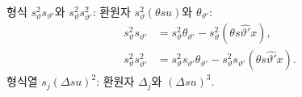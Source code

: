
형식 $s_\vartheta^2s_{\vartheta'}$와 $s_\vartheta^2s_{\vartheta'}^2$: 환원자 $s_\vartheta^2(\theta su)$와 $\theta_{\vartheta'}$:
\[
\begin{aligned}
s_\vartheta^2s_{\vartheta'}&=s_\vartheta^2\theta_{\vartheta'}-s_\vartheta^2(\theta s\widehat{\vartheta'}x),\\
s_\vartheta^2s_{\vartheta'}^2&=s_\vartheta^2s_{\vartheta'}\theta_{\vartheta'}-s_\vartheta^2s_{\vartheta'}(\theta s\widehat{\vartheta'}x).
\end{aligned}
\]
형식열 $s_j(\Delta su)^2$: 환원자 $\Delta_j$와 $(\Delta su)^3$.

